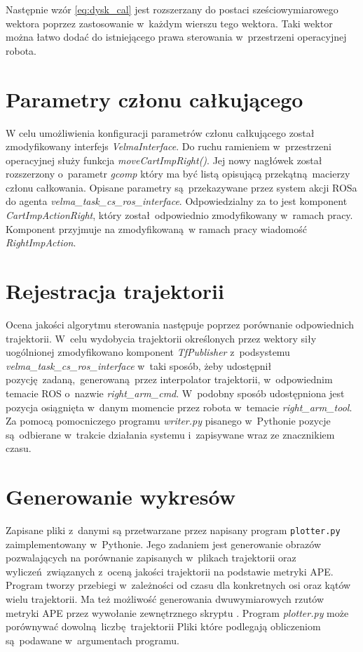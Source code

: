 Następnie wzór \ref{eq:dysk_cal} jest rozszerzany do postaci sześciowymiarowego wektora poprzez zastosowanie w~każdym wierszu tego wektora. Taki wektor można łatwo dodać do istniejącego prawa sterowania w~przestrzeni operacyjnej robota.

\section{Parametry członu całkującego}
W celu umożliwienia konfiguracji parametrów członu całkującego został zmodyfikowany interfejs \textit{VelmaInterface}. Do ruchu ramieniem w~przestrzeni operacyjnej służy funkcja \textit{moveCartImpRight()}. Jej nowy nagłówek został rozszerzony o~parametr \textit{gcomp} który ma być listą opisującą przekątną macierzy członu całkowania. Opisane parametry są przekazywane przez system akcji ROSa do agenta \textit{velma\_task\_cs\_ros\_interface}. Odpowiedzialny za to jest komponent \textit{CartImpActionRight}, który został odpowiednio zmodyfikowany w~ramach pracy. Komponent przyjmuje na zmodyfikowaną w ramach pracy wiadomość \textit{RightImpAction}. 
 
\section{Rejestracja trajektorii}
Ocena jakości algorytmu sterowania następuje poprzez porównanie odpowiednich trajektorii. W~celu wydobycia trajektorii określonych przez wektory siły uogólnionej zmodyfikowano komponent \textit{TfPublisher} z~podsystemu \textit{velma\_task\_cs\_ros\_interface} w~taki sposób, żeby udostępnił pozycję zadaną, generowaną przez interpolator trajektorii, w~odpowiednim temacie ROS o~nazwie \textit{right\_arm\_cmd}. W~podobny sposób udostępniona jest pozycja osiągnięta w~danym momencie przez robota w~temacie \textit{right\_arm\_tool}. Za pomocą pomocniczego programu \textit{writer.py} pisanego w~Pythonie pozycje są odbierane w~trakcie działania systemu i~zapisywane wraz ze znacznikiem czasu.


\section{Generowanie wykresów}
Zapisane pliki z~danymi są przetwarzane przez napisany program \texttt{plotter.py} zaimplementowany w~Pythonie. Jego zadaniem jest generowanie obrazów pozwalających na porównanie zapisanych w~plikach trajektorii oraz wyliczeń związanych z~oceną jakości trajektorii na podstawie metryki APE. Program tworzy przebiegi w~zależności od czasu dla konkretnych osi oraz kątów wielu trajektorii. Ma też możliwość generowania dwuwymiarowych rzutów metryki APE przez wywołanie zewnętrznego skryptu \cite{bib:evaluate_ape}. Program \textit{plotter.py} może porównywać dowolną liczbę trajektorii Pliki które podlegają obliczeniom są podawane w~argumentach programu.


